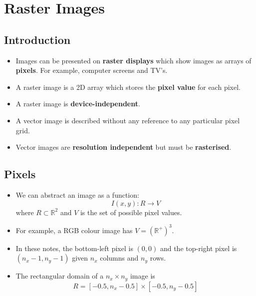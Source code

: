 
\section{Raster Images}

\subsection{Introduction}

\begin{itemize}
  \item Images can be presented on \textbf{raster displays} which show images as arrays of \textbf{pixels}. For example, computer screens and TV's.
  \item A raster image is a 2D array which stores the \textbf{pixel value} for each pixel.
  \item A raster image is \textbf{device-independent}.
  \item A vector image is described without any reference to any particular pixel grid.
  \item Vector images are \textbf{resolution independent} but must be \textbf{rasterised}.
\end{itemize}

\subsection{Pixels}

\begin{itemize}
  \item We can abstract an image as a function:
    \begin{equation*} \label{eu_eqn}
      I(x,y) : R \rightarrow V
    \end{equation*}
        where $R \subset \mathbb{R}^{2}$ and $V$ is the set of possible pixel values.
  \item For example, a RGB colour image has $V = (\mathbb{R}^{+})^{3}$.
  \item In these notes, the bottom-left pixel is $(0,0)$ and the top-right pixel is $(n_{x} - 1, n_{y} - 1)$ given $n_{x}$ columns and $n_{y}$ rows.
  \item The rectangular domain of a $n_{x} \times n_{y}$ image is
  \begin{equation*} \label{eu_eqn}
    R = [-0.5, n_{x} - 0.5] \times [-0.5, n_{y} - 0.5]
  \end{equation*}
\end{itemize}
